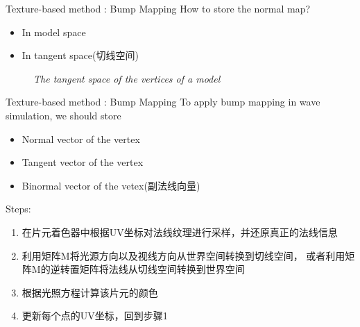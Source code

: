 \documentclass{beamer}
\begin{document}
\begin{frame}{Texture-based method : Bump Mapping}
  How to store the normal map?
  \begin{itemize}
    \item In model space
    \item In tangent space(切线空间)
  \end{itemize}

  \begin{figure}[thpb]
    \centering
    \caption*{\emph{The tangent space of the vertices of a model}}
  \label{fig:system}
  \end{figure}
\end{frame}
\begin{frame}{Texture-based method : Bump Mapping}
  To apply bump mapping in wave simulation, we should store
  \begin{itemize}
    \item Normal vector of the vertex
    \item \textcolor[rgb]{0,0,1}{Tangent vector of the vertex}
    \item \textcolor[rgb]{0,0,1}{Binormal vector of the vetex(副法线向量)}
  \end{itemize}
  Steps:
  \begin{enumerate}
    \item 在片元着色器中根据UV坐标对法线纹理进行采样，并还原真正的法线信息
    \item 利用矩阵M将光源方向以及视线方向从世界空间转换到切线空间，
          或者利用矩阵M的逆转置矩阵将法线从切线空间转换到世界空间
    \item 根据光照方程计算该片元的颜色
    \item 更新每个点的UV坐标，回到步骤1
  \end{enumerate}
\end{frame}
\end{document}
